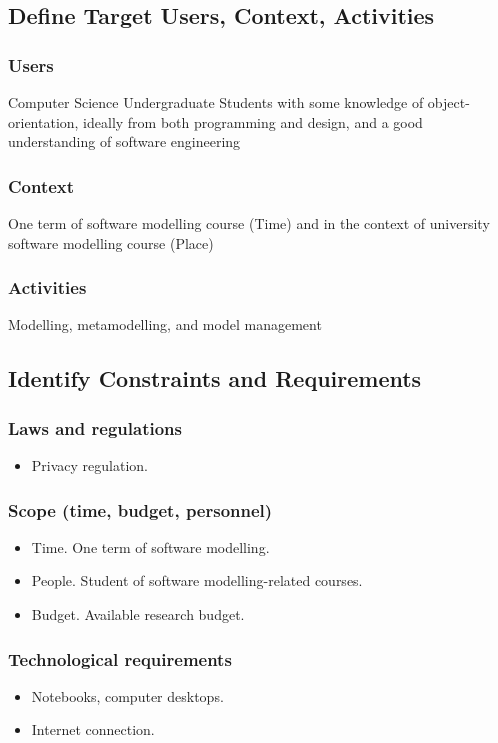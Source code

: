 \documentclass[12pt, a4paper]{report}
\begin{document}
\begin{appendices}
\subsection{Define Target Users, Context, Activities}
\subsubsection{Users}
Computer Science Undergraduate Students with some knowledge of object-orientation, ideally from both programming and design, and a good understanding of software engineering
\subsubsection{Context}
One term of software modelling course (Time) and in the context of university software modelling course (Place)
\subsubsection{Activities}
Modelling, metamodelling, and model management

\subsection{Identify Constraints and Requirements}
\subsubsection{Laws and regulations}
\begin{itemize}
\item Privacy regulation.
\end{itemize}
\subsubsection{Scope (time, budget, personnel)}
\begin{itemize}
\item Time. One term of software modelling.
\item People. Student of software modelling-related courses.
\item Budget. Available research budget.
\end{itemize}
\subsubsection{Technological requirements}
\begin{itemize}
\item Notebooks, computer desktops.
\item Internet connection.
\end{itemize}

\end{appendices}
\end{document}
